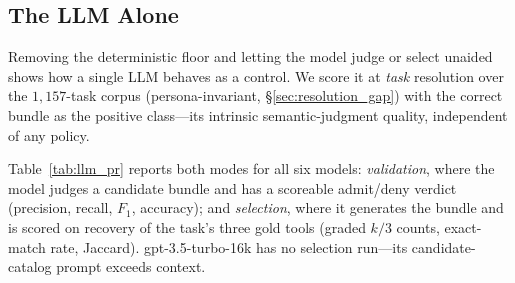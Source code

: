 \documentclass[sigconf,review,anonymous]{acmart}
\begin{document}
\subsection{The LLM Alone}
\label{sec:llm_alone}

Removing the deterministic floor and letting the model judge or select unaided shows how a single LLM behaves as a control. We score it at \emph{task} resolution over the $1{,}157$-task corpus (persona-invariant, \S\ref{sec:resolution_gap}) with the correct bundle as the positive class---its intrinsic semantic-judgment quality, independent of any policy.

Table~\ref{tab:llm_pr} reports both modes for all six models: \emph{validation}, where the model judges a candidate bundle and has a scoreable admit/deny verdict (precision, recall, $F_1$, accuracy); and \emph{selection}, where it generates the bundle and is scored on recovery of the task's three gold tools (graded $k/3$ counts, exact-match rate, Jaccard). gpt-3.5-turbo-16k has no selection run---its candidate-catalog prompt exceeds context.
\end{document}
